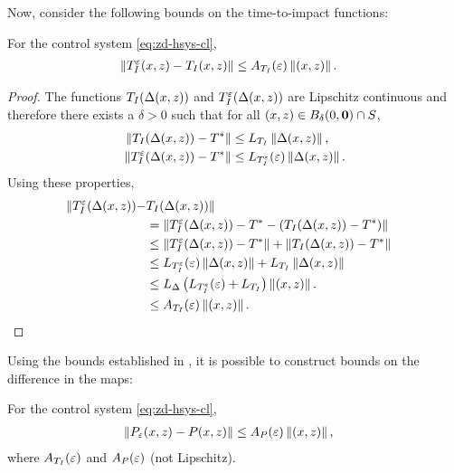 \documentclass[twocolumn]{article}
\begin{document}
Now, consider the following bounds on the time-to-impact functions:

\begin{lemma}
  \label{lemma:time-to-impact}
  For the control system \eqref{eq:zd-hsys-cl},
  \begin{align}
    \| T_{I}^{\varepsilon}(x, z) - T_{I}(x, z) \| &\leq A_{T_{I}}(\varepsilon) \left\|(x, z)\right\|.    
  \end{align}
\end{lemma}
\begin{proof}
  The functions $T_{I}(\Delta(x, z))$ and $T_{I}^{\varepsilon}(\Delta(x, z))$ are Lipschitz continuous and therefore there exists a $\delta > 0$ such that for all $(x, z) \in B_{\delta}(0, {\mathbf 0}) \cap S$,
  \begin{align}
    \nonumber
    \| T_{I}(\Delta(x, z)) - T^{*} \| &\leq L_{T_{I}} \left\|\Delta(x, z)\right\|,\\
    \| T_{I}^{\varepsilon}(\Delta(x, z)) - T^{*} \| &\leq L_{T_{I}^{\varepsilon}}(\varepsilon) \left\|\Delta(x, z)\right\|.
  \end{align}
  Using these properties,
  \begin{align}
    \| T_{I}^{\varepsilon}(\Delta(x, z)) - &T_{I}(\Delta(x, z)) \|\\
    \nonumber
    &= \left\| T_{I}^{\varepsilon}(\Delta(x, z)) - T^{*} - \left(T_{I}(\Delta(x, z)) - T^{*}\right) \right\|\\
    \nonumber
    &\leq \left\| T_{I}^{\varepsilon}(\Delta(x, z)) - T^{*} \right\| + \left\| T_{I}(\Delta(x, z)) - T^{*} \right\|\\
    \nonumber
    &\leq L_{T_{I}^{\varepsilon}}(\varepsilon) \left\|\Delta(x, z)\right\| + L_{T_{I}} \left\|\Delta(x, z)\right\|\\
    \nonumber
    &\leq L_{\Delta} \left(L_{T_{I}^{\varepsilon}}(\varepsilon) + L_{T_{I}}\right) \left\|(x, z)\right\| .\\
    \nonumber
    &\leq A_{T_{I}}(\varepsilon) \left\|(x, z)\right\|. &\qedhere
  \end{align}
\end{proof}
%
Using the bounds established in , it is possible to construct bounds on the difference in the \Poincare{} maps:
%
\begin{lemma}
  \label{lemma:hard-one}
  For the control system \eqref{eq:zd-hsys-cl},
  \begin{align}
    \| P_{\varepsilon}(x, z) - P(x, z) \| &\leq A_{P}(\varepsilon) \left\|(x, z)\right\|,
  \end{align}
  where $A_{T_{I}}(\varepsilon)$ and $A_{P}(\varepsilon)$ (not Lipschitz).
\end{lemma}
\end{document}
